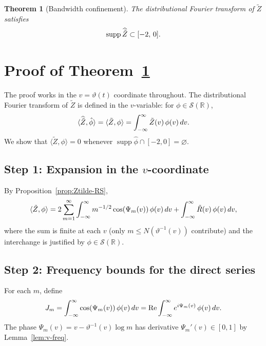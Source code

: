 \documentclass{article}
\newcommand{\tmop}[1]{\ensuremath{\operatorname{#1}}}
\newtheorem{theorem}{Theorem}
\newcommand{\supp}{\tmop{supp}}
\begin{document}
\begin{theorem}
  [Bandwidth confinement]\label{thm:II} The distributional Fourier transform
  of $\tilde{Z}$ satisfies
  \[ \supp \widehat{\tilde{Z}} \subset [- 2, \hspace{0.17em} 0] . \]
\end{theorem}

\section{Proof of Theorem~\ref{thm:II}}\label{sec:proof-II}

The proof works in the $v = \vartheta (t)$ coordinate throughout. The
distributional Fourier transform of $\tilde{Z}$ is defined in the
$v$-variable: for $\phi \in \mathcal{S} (\mathbb{R})$,
\[ \langle \widehat{\tilde{Z}}, \hat{\phi} \rangle = \langle \tilde{Z}, \phi
   \rangle = \int_{- \infty}^{\infty} \tilde{Z} (v)  \hspace{0.17em} \phi (v) 
   \hspace{0.17em} dv. \]
We show that $\langle \tilde{Z}, \phi \rangle = 0$ whenever $\supp \hat{\phi}
\cap [- 2, 0] = \varnothing$.

\subsection*{Step 1: Expansion in the $v$-coordinate}

By Proposition~\ref{prop:Ztilde-RS},
\begin{equation}
  \label{eq:pairing-v} \langle \tilde{Z}, \phi \rangle = 2 \sum_{m =
  1}^{\infty} \int_{- \infty}^{\infty} m^{- 1 / 2} \cos (\Psi_m (v)) 
  \hspace{0.17em} \phi (v)  \hspace{0.17em} dv + \int_{- \infty}^{\infty}
  \tilde{R} (v)  \hspace{0.17em} \phi (v)  \hspace{0.17em} dv,
\end{equation}
where the sum is finite at each $v$ (only $m \le N (\vartheta^{- 1} (v))$
contribute) and the interchange is justified by $\phi \in \mathcal{S}
(\mathbb{R})$.

\subsection*{Step 2: Frequency bounds for the direct series}

For each $m$, define
\begin{equation}
  \label{eq:Jm} J_m = \int_{- \infty}^{\infty} \cos (\Psi_m (v)) 
  \hspace{0.17em} \phi (v)  \hspace{0.17em} dv = \mathrm{Re} \int_{-
  \infty}^{\infty} e^{i \Psi_m (v)}  \hspace{0.17em} \phi (v)  \hspace{0.17em}
  dv.
\end{equation}
The phase $\Psi_m (v) = v - \vartheta^{- 1} (v) \log m$ has derivative
$\Psi_m' (v) \in [0, 1]$ by Lemma~\ref{lem:v-freq}.
\end{document}

